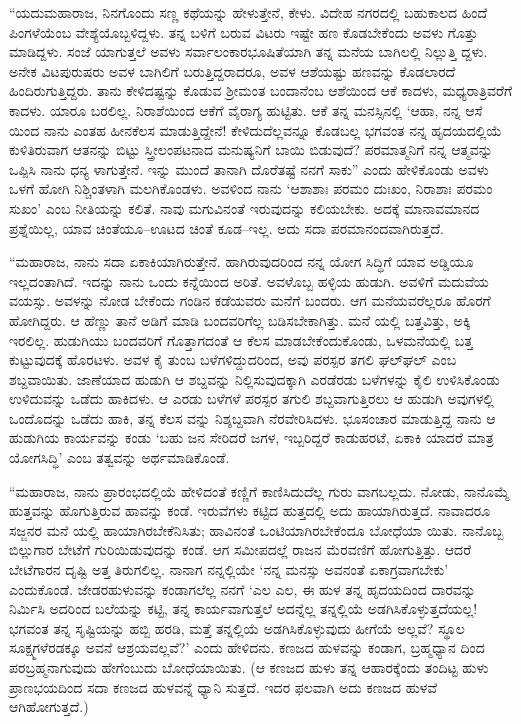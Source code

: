 “ಯದುಮಹಾರಾಜ, ನಿನಗೊಂದು ಸಣ್ಣ ಕಥೆಯನ್ನು ಹೇಳುತ್ತೇನೆ, ಕೇಳು. ವಿದೇಹ ನಗರದಲ್ಲಿ ಬಹುಕಾಲದ ಹಿಂದೆ ಪಿಂಗಳೆಯೆಂಬ ವೇಶ್ಯೆಯೊಬ್ಬಳಿದ್ದಳು. ತನ್ನ ಬಳಿಗೆ ಬರುವ ವಿಟರು ಇಷ್ಟೇ ಹಣ ಕೊಡಬೇಕೆಂದು ಅವಳು ಗೊತ್ತು ಮಾಡಿದ್ದಳು. ಸಂಜೆ ಯಾಗುತ್ತಲೆ ಅವಳು ಸರ್ವಾಲಂಕಾರಭೂಷಿತೆಯಾಗಿ ತನ್ನ ಮನೆಯ ಬಾಗಿಲಲ್ಲಿ ನಿಲ್ಲುತ್ತಿ ದ್ದಳು. ಅನೇಕ ವಿಟಪುರುಷರು ಅವಳ ಬಾಗಿಲಿಗೆ ಬರುತ್ತಿದ್ದರಾದರೂ, ಅವಳ ಆಶೆಯಷ್ಟು ಹಣವನ್ನು ಕೊಡಲಾರದೆ ಹಿಂದಿರುಗುತ್ತಿದ್ದರು. ತಾನು ಕೇಳಿದಷ್ಟನ್ನು ಕೊಡುವ ಶ್ರೀಮಂತ ಬಂದಾನೆಂಬ ಆಶೆಯಿಂದ ಆಕೆ ಕಾದಳು, ಮಧ್ಯರಾತ್ರಿವರೆಗೆ ಕಾದಳು. ಯಾರೂ ಬರಲಿಲ್ಲ. ನಿರಾಶೆಯಿಂದ ಆಕೆಗೆ ವೈರಾಗ್ಯ ಹುಟ್ಟಿತು. ಆಕೆ ತನ್ನ ಮನಸ್ಸಿನಲ್ಲಿ ‘ಆಹಾ, ನನ್ನ ಆಸೆ ಯಿಂದ ನಾನು ಎಂತಹ ಹೀನಕೆಲಸ ಮಾಡುತ್ತಿದ್ದೇನೆ! ಕೇಳಿದುದೆಲ್ಲವನ್ನೂ ಕೊಡಬಲ್ಲ ಭಗವಂತ ನನ್ನ ಹೃದಯದಲ್ಲಿಯೆ ಕುಳಿತಿರುವಾಗ ಆತನನ್ನು ಬಿಟ್ಟು ಸ್ತ್ರೀಲಂಪಟನಾದ ಮನುಷ್ಯನಿಗೆ ಬಾಯಿ ಬಿಡುವುದೆ? ಪರಮಾತ್ಮನಿಗೆ ನನ್ನ ಆತ್ಮವನ್ನು ಒಪ್ಪಿಸಿ ನಾನು ಧನ್ಯ ಳಾಗುತ್ತೇನೆ. ಇನ್ನು ಮುಂದೆ ತಾನಾಗಿ ದೊರೆತಷ್ಟೆ ನನಗೆ ಸಾಕು” ಎಂದು ಹೇಳಿಕೊಂಡು ಅವಳು ಒಳಗೆ ಹೋಗಿ ನಿಶ್ಚಿಂತಳಾಗಿ ಮಲಗಿಕೊಂಡಳು. ಅವಳಿಂದ ನಾನು ‘ಆಶಾಶಾಃ ಪರಮಂ ದುಃಖಂ, ನಿರಾಶಾಃ ಪರಮಂ ಸುಖಂ’ ಎಂಬ ನೀತಿಯನ್ನು ಕಲಿತೆ. ನಾವು ಮಗುವಿನಂತೆ ಇರುವುದನ್ನು ಕಲಿಯಬೇಕು. ಅದಕ್ಕೆ ಮಾನಾವಮಾನದ ಪ್ರಶ್ನೆಯಿಲ್ಲ, ಯಾವ ಚಿಂತೆಯೂ–ಊಟದ ಚಿಂತೆ ಕೂಡ–ಇಲ್ಲ. ಅದು ಸದಾ ಪರಮಾನಂದವಾಗಿರುತ್ತದೆ.

“ಮಹಾರಾಜ, ನಾನು ಸದಾ ಏಕಾಕಿಯಾಗಿರುತ್ತೇನೆ. ಹಾಗಿರುವುದರಿಂದ ನನ್ನ ಯೋಗ ಸಿದ್ಧಿಗೆ ಯಾವ ಅಡ್ಡಿಯೂ ಇಲ್ಲದಂತಾಗಿದೆ. ಇದನ್ನು ನಾನು ಒಂದು ಕನ್ನೆಯಿಂದ ಅರಿತೆ. ಅವಳೊಬ್ಬ ಹಳ್ಳಿಯ ಹುಡುಗಿ. ಅವಳಿಗೆ ಮದುವೆಯ ವಯಸ್ಸು. ಅವಳನ್ನು ನೋಡ ಬೇಕೆಂದು ಗಂಡಿನ ಕಡೆಯವರು ಮನೆಗೆ ಬಂದರು. ಆಗ ಮನೆಯವರೆಲ್ಲರೂ ಹೊರಗೆ ಹೋಗಿದ್ದರು. ಆ ಹೆಣ್ಣು ತಾನೆ ಅಡಿಗೆ ಮಾಡಿ ಬಂದವರಿಗೆಲ್ಲ ಬಡಿಸಬೇಕಾಗಿತ್ತು. ಮನೆ ಯಲ್ಲಿ ಬತ್ತವಿತ್ತು, ಅಕ್ಕಿ ಇರಲಿಲ್ಲ. ಹುಡುಗಿಯು ಬಂದವರಿಗೆ ಗೊತ್ತಾಗದಂತೆ ಆ ಕೆಲಸ ಮಾಡಬೇಕೆಂದುಕೊಂಡು, ಒಳಮನೆಯಲ್ಲಿ ಬತ್ತ ಕುಟ್ಟುವುದಕ್ಕೆ ಹೊರಟಳು. ಅವಳ ಕೈ ತುಂಬ ಬಳೆಗಳಿದ್ದುದರಿಂದ, ಅವು ಪರಸ್ಪರ ತಗಲಿ ಘಲ್​ಘಲ್ ಎಂಬ ಶಬ್ದವಾಯಿತು. ಜಾಣೆಯಾದ ಹುಡುಗಿ ಆ ಶಬ್ದವನ್ನು ನಿಲ್ಲಿಸುವುದಕ್ಕಾಗಿ ಎರಡೆರಡು ಬಳೆಗಳನ್ನು ಕೈಲಿ ಉಳಿಸಿಕೊಂಡು ಉಳಿದುವನ್ನು ಒಡೆದು ಹಾಕಿದಳು. ಆ ಎರಡು ಬಳೆಗಳೆ ಪರಸ್ಪರ ತಗುಲಿ ಶಬ್ದವಾಗುತ್ತಿರಲು ಆ ಹುಡುಗಿ ಅವುಗಳಲ್ಲಿ ಒಂದೊದನ್ನು ಒಡೆದು ಹಾಕಿ, ತನ್ನ ಕೆಲಸ ವನ್ನು ನಿಶ್ಶಬ್ದವಾಗಿ ನೆರವೇರಿಸಿದಳು. ಭೂಸಂಚಾರ ಮಾಡುತ್ತಿದ್ದ ನಾನು ಆ ಹುಡುಗಿಯ ಕಾರ್ಯವನ್ನು ಕಂಡು ‘ಬಹು ಜನ ಸೇರಿದರೆ ಜಗಳ, ಇಬ್ಬರಿದ್ದರೆ ಕಾಡುಹರಟೆ, ಏಕಾಕಿ ಯಾದರೆ ಮಾತ್ರ ಯೋಗಸಿದ್ಧಿ’ ಎಂಬ ತತ್ವವನ್ನು ಅರ್ಥಮಾಡಿಕೊಂಡೆ.

“ಮಹಾರಾಜ, ನಾನು ಪ್ರಾರಂಭದಲ್ಲಿಯೆ ಹೇಳಿದಂತೆ ಕಣ್ಣಿಗೆ ಕಾಣಿಸಿದುದೆಲ್ಲ ಗುರು ವಾಗಬಲ್ಲದು. ನೋಡು, ನಾನೊಮ್ಮೆ ಹುತ್ತವನ್ನು ಹೊಗುತ್ತಿರುವ ಹಾವನ್ನು ಕಂಡೆ. ಇರುವೆಗಳು ಕಟ್ಟಿದ ಹುತ್ತದಲ್ಲಿ ಅದು ಹಾಯಾಗಿರುತ್ತದೆ. ನಾವಾದರೂ ಸಜ್ಜನರ ಮನೆ ಯಲ್ಲಿ ಹಾಯಾಗಿರಬೇಕೆನಿಸಿತು; ಹಾವಿನಂತೆ ಒಂಟಿಯಾಗಿರಬೇಕೆಂದೂ ಬೋಧೆಯಾ ಯಿತು. ನಾನೊಬ್ಬ ಬಿಲ್ಲುಗಾರ ಬೇಟೆಗೆ ಗುರಿಯಿಡುವುದನ್ನು ಕಂಡೆ. ಆಗ ಸಮೀಪದಲ್ಲೆ ರಾಜನ ಮೆರವಣಿಗೆ ಹೋಗುತ್ತಿತ್ತು. ಆದರೆ ಬೇಟೆಗಾರನ ದೃಷ್ಟಿ ಅತ್ತ ತಿರುಗಲಿಲ್ಲ. ನಾನಾಗ ನನ್ನಲ್ಲಿಯೇ ‘ನನ್ನ ಮನಸ್ಸು ಅವನಂತೆ ಏಕಾಗ್ರವಾಗಬೇಕು’ ಎಂದುಕೊಂಡೆ. ಜೇಡರಹುಳುವನ್ನು ಕಂಡಾಗಲೆಲ್ಲ ನನಗೆ ‘ಎಲ ಎಲ, ಈ ಹುಳ ತನ್ನ ಹೃದಯದಿಂದ ದಾರವನ್ನು ನಿರ್ಮಿಸಿ ಅದರಿಂದ ಬಲೆಯನ್ನು ಕಟ್ಟಿ, ತನ್ನ ಕಾರ್ಯವಾಗುತ್ತಲೆ ಅದನ್ನೆಲ್ಲ ತನ್ನಲ್ಲಿಯೆ ಅಡಗಿಸಿಕೊಳ್ಳುತ್ತದೆಯಲ್ಲ! ಭಗವಂತ ತನ್ನ ಸೃಷ್ಟಿಯನ್ನು ಹಬ್ಬಿ ಹರಡಿ, ಮತ್ತೆ ತನ್ನಲ್ಲಿಯೆ ಅಡಗಿಸಿಕೊಳ್ಳುವುದು ಹೀಗೆಯೆ ಅಲ್ಲವೆ? ಸ್ಥೂಲ ಸೂಕ್ಷ್ಮಗಳೆರಡಕ್ಕೂ ಅವನೆ ಆಶ್ರಯವಲ್ಲವೆ?’ ಎಂದು ಹೇಳಿದನು. ಕಣಜದ ಹುಳವನ್ನು ಕಂಡಾಗ, ಬ್ರಹ್ಮಧ್ಯಾನ ದಿಂದ ಪರಬ್ರಹ್ಮನಾಗುವುದು ಹೇಗೆಂಬುದು ಬೋಧೆಯಾಯಿತು. (ಆ ಕಣಜದ ಹುಳು ತನ್ನ ಆಹಾರಕ್ಕೆಂದು ತಂದಿಟ್ಟ ಹುಳು ಪ್ರಾಣಭಯದಿಂದ ಸದಾ ಕಣಜದ ಹುಳವನ್ನೆ ಧ್ಯಾನಿ ಸುತ್ತದೆ. ಇದರ ಫಲವಾಗಿ ಅದು ಕಣಜದ ಹುಳವೆ ಆಗಿಹೋಗುತ್ತದೆ.)

